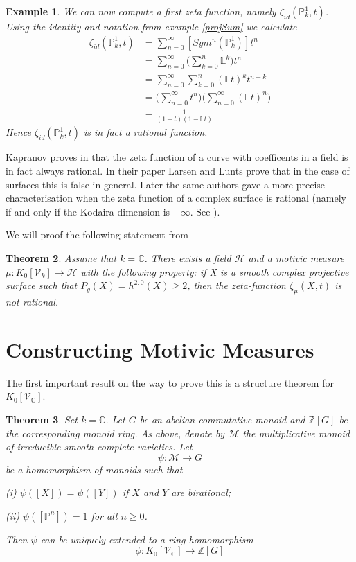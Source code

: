 \documentclass[11pt, a4paper, german]{article}
\theoremstyle{plain}
\newtheorem{theorem}{Theorem}
\newtheorem{example}[theorem]{Example}
\theoremstyle{definition}
\newcommand{\gring}[1][k]{K_0[\mathcal{V}_#1]}
\begin{document}
\begin{example}
    We can now compute a first zeta function, namely $\zeta_{id}(\mathbb{P}_k^1, t)$. Using the identity and notation from example \ref{projSum}
    we calculate
    \begin{align*}
        \zeta_{id}(\mathbb{P}_k^1, t) & = \sum_{n=0}^\infty [Sym^n({\mathbb{P}_k^1})]t^n \\
                                      & = \sum_{n=0}^\infty \big(\sum_{k=0}^n \mathbb{L}^k\big) t^n \\
                                      & = \sum_{n=0}^\infty \sum_{k=0}^n (\mathbb{L}t)^k t^{n-k} \\
                                      & = \Big( \sum_{n=0}^\infty t^n \Big) \Big( \sum_{n=0}^\infty (\mathbb{L}t)^n \Big) \\
                                      & = \frac{1}{(1-t)(1-\mathbb{L}t)}
    \end{align*}
    Hence $\zeta_{id}(\mathbb{P}_k^1, t)$ is in fact a rational function.
\end{example}

Kapranov proves in \cite{kapranov} that the zeta function of a curve with coefficents in a field is in fact always rational. 
In their paper \cite{MR1996804} Larsen and Lunts prove that in the case of surfaces this is false in general.
Later the same authors gave a more precise characterisation when the zeta function of a complex surface is rational 
(namely if and only if the Kodaira dimension is $-\infty$. See \cite{LL2}).

We will proof the following statement from \cite{MR1996804}
\begin{theorem}
    Assume that $k = \mathbb{C}$. There exists a field $\mathcal{H}$ and a motivic measure $\mu: \gring \to \mathcal{H}$ with the following
    property: if X is a smooth complex projective surface such that $P_g(X)=h^{2,0}(X) \ge 2$, then the zeta-function $\zeta_{\mu}(X,t)$
    is not rational.
\end{theorem}

\section{Constructing Motivic Measures}

The first important result on the way to prove this is a structure theorem for $\gring[\mathbb{C}]$.
\begin{theorem}
    \label{th1}
    Set $k = \mathbb{C}$. Let $G$ be an abelian commutative monoid and $\mathbb{Z}[G]$ be the corresponding monoid ring. As above, denote
    by $\mathcal{M}$ the multiplicative monoid of irreducible smooth complete varieties. Let
    \[
        \psi: \mathcal{M} \to G
    \]
    be a homomorphism of monoids such that

    (i) $\psi([X]) = \psi([Y])$ if $X$ and $Y$ are birational;

    (ii) $\psi([\mathbb{P}^n]) = 1$ for all $n \ge 0$.

    Then $\psi$ can be uniquely extended to a ring homomorphism 
    \[
        \phi: \gring[\mathbb{C}] \to \mathbb{Z} [G]
    \]
\end{theorem}
\end{document}
